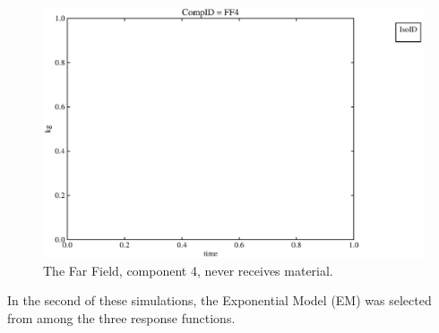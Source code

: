 \begin{figure}[ht!]
\begin{minipage}[b]{0.45\linewidth}
  \includegraphics[width=\textwidth]{./chapters/demonstration/base/lpPFMII0.eps}
  \caption[Case LPPFMII Far Field Contaminants.]{ 
    The Far Field, component 4, never receives material.
    }
  \label{fig:lpEnd}
  \end{minipage}
\end{figure} 

In the second of these simulations, the Exponential Model (EM) was 
selected from among the three response functions. 

